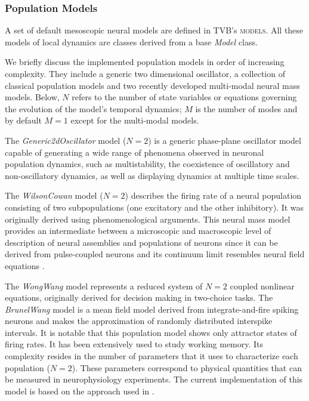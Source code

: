 \documentclass{bioinfo}
\newcommand*{\tvbmodule}[1]{{\textsc{#1}}}          %
\newcommand*{\tvbclass}[1]{{\ttfamily\emph{#1}}}    %
\begin{document}
\begin{methods}
    \subsubsection{Population Models}
    A set of default mesoscopic neural models are defined in TVB's 
    \tvbmodule{models}. All these models of local dynamics are classes derived
    from a base \tvbclass{Model} class. 
    
    We briefly discuss the implemented population models in order of
    increasing complexity. They include a generic two dimensional oscillator,
    a collection of classical  population models and two recently developed
    multi-modal neural mass models. Below, $N$ refers to the number of state
    variables or equations governing the  evolution of the model's temporal
    dynamics; $M$ is the number of modes and by default $M=1$ except for the
    multi-modal models.
    
    The \tvbclass{Generic2dOscillator} model ($N=2$) is a generic phase-plane
    oscillator model capable of generating a wide range of phenomena observed
    in neuronal population dynamics, such as multistability, the coexistence
    of oscillatory and non-oscillatory dynamics, as well as displaying
    dynamics at multiple  time scales.
    
    The \tvbclass{WilsonCowan} model \citep{Wilson_1972} ($N=2$) describes the 
    firing rate of a neural population consisting of two subpopulations (one 
    excitatory and the other inhibitory). It was originally derived using 
    phenomenological arguments. This neural mass model provides an intermediate 
    between a microscopic and macroscopic level of description of neural 
    assemblies and populations of neurons since it can be derived from 
    pulse-coupled neurons \citep{Haken_2001} and its continuum limit 
    resembles neural field equations \citep{Jirsa_1996}.  
    
    The \tvbclass{WongWang} model \citep{Wong_2006} represents a reduced
    system of $N=2$ coupled  nonlinear equations, originally derived for
    decision making in two-choice tasks.  The \tvbclass{BrunelWang} model
    \citep{Brunel_2001, Brunel_2003} is a mean  field model derived from
    integrate-and-fire  spiking neurons and makes the approximation of
    randomly distributed interspike  intervals. It is notable that this
    population model shows only attractor states of  firing rates. It has been
    extensively used to  study working memory. Its complexity resides in the
    number of parameters  that it uses to characterize each population
    ($N=2$). These parameters  correspond to physical quantities that can be
    measured in neurophysiology  experiments. The current implementation of
    this model is based on the approach  used in \citep{Deco_2012}.
    

\end{methods}
\end{document}
